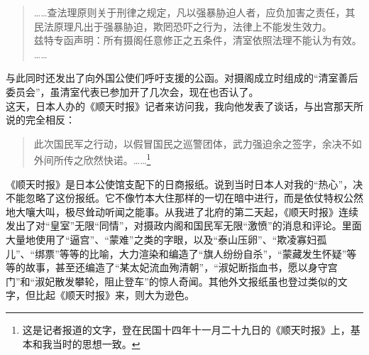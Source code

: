 \begin{quote}
	……查法理原则关于刑律之规定，凡以强暴胁迫人者，应负加害之责任，其民法原理凡出于强暴胁迫，欺罔恐吓之行为，法律上不能发生效力。\\

兹特专函声明：所有摄阁任意修正之五条件，清室依照法理不能认为有效。\\

……\\
\end{quote}

与此同时还发出了向外国公使们呼吁支援的公函。对摄阁成立时组成的“清室善后委员会”，虽清室代表已参加开了几次会，现在也否认了。\\

这天，日本人办的《顺天时报》记者来访问我，我向他发表了谈话，与出宫那天所说的完全相反：\\

\begin{quote}
	此次国民军之行动，以假冒国民之巡警团体，武力强迫余之签字，余决不如外间所传之欣然快诺。……\footnote{这是记者报道的文字，登在民国十四年十一月二十九日的《顺天时报》上，基本和我当时的思想一致。}\\
\end{quote}

《顺天时报》是日本公使馆支配下的日商报纸。说到当时日本人对我的“热心”，决不能忽略了这份报纸。它不像竹本大住那样的一切在暗中进行，而是依仗特权公然地大嚷大叫，极尽耸动听闻之能事。从我进了北府的第二天起，《顺天时报》连续发出了对“皇室”无限“同情”，对摄政内阁和国民军无限“激愤”的消息和评论。里面大量地使用了“逼宫”、“蒙难”之类的字眼，以及“泰山压卵”、“欺凌寡妇孤儿”、“绑票”等等的比喻，大力渲染和编造了“旗人纷纷自杀”，“蒙藏发生怀疑”等等的故事，甚至还编造了“某太妃流血殉清朝”，“淑妃断指血书，愿以身守宫门”和“淑妃散发攀轮，阻止登车”的惊人奇闻。其他外文报纸虽也登过类似的文字，但比起《顺天时报》来，则大为逊色。\\